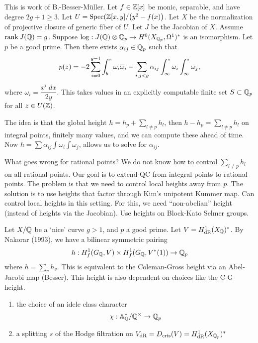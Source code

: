 This is work of B.-Besser-M\"uller. Let $f \in \mathbb{Z}[x]$ be monic, separable, and have degree $2g+1 \geq 3$. Let $U= \operatorname{Spec}(\mathbb{Z}[x,y]/ \big(y^2 - f(x)\big)$. Let $X$ be the normalization of projective closure of generic fiber of $U$. Let $J$ be the Jacobian of $X$. Assume $\operatorname{rank} J(\mathbb{Q})= g$. Suppose $\log: J(\mathbb{Q}) \otimes \mathbb{Q}_p \to H^0(X_{\mathbb{Q}_p}, \Omega^1)^*$ is an isomorphism. Let $p$ be a good prime. Then there exists $\alpha_{ij} \in \mathbb{Q}_p$ such that
	\[
	p(z)= -2 \sum_{i=0}^{g-1} \int_b^z \omega_i \overline{\omega}_i - \sum_{i,j<g} \alpha_{ij} \int_\infty^z \omega_i \int_\infty^z \omega_j,
	\]
where $\omega_i= \dfrac{x^i\;dx}{2y}$. This takes values in an explicitly computable finite set $S \subset \mathbb{Q}_p$ for all $z \in U(\mathbb{Z})$. 


The idea is that the global height $h= h_p + \sum_{l \neq p} h_l$, then $h - h_p= \sum_{l \neq p} h_l$ on integral points, finitely many values, and we can compute these ahead of time. Now $h= \sum \alpha_{ij} \int \omega_i \int \omega_j$, allows us to solve for $\alpha_{ij}$. 


What goes wrong for rational points? We do not know how to control $\sum_{l \neq p} h_l$ on all rational points. Our goal is to extend QC from integral points to rational points. The problem is that we need to control local heights away from $p$. The solution is to use heights that factor through Kim's unipotent Kummer map. Can control local heights in this setting. For this, we need ``non-abelian'' height (instead of heights via the Jacobian). Use heights on Block-Kato Selmer groups.


Let $X/\mathbb{Q}$ be a `nice' curve $g>1$, and $p$ a good prime. Let $V= H^1_{\text{dR}}(X_{\mathbb{Q}})^*$. By Nakorar (1993), we have a bilinear symmetric pairing
	\[
	h: H_f^1(G_{\mathbb{Q}}, V) \times H_f^1(G_{\mathbb{Q}}, V^*(1)) \to \mathbb{Q}_p
	\]
where $h= \sum_v h_v$. This is equivalent to the Coleman-Gross height via an \etale Abel-Jacobi map (Besser). This height is also dependent on choices like the C-G height. 


\begin{enumerate}[1.]
\item the choice of an idele class character
	\[
	\chi: \mathbb{A}_{\mathbb{Q}}^*/\mathbb{Q}^\times \to \mathbb{Q}_p
	\]

\item a splitting $s$ of the Hodge filtration on $V_{\text{dR}}= D_{\text{cris}}(V)= H_{\text{dR}}^1(X_{\mathbb{Q}_p})^*$
\end{enumerate}


